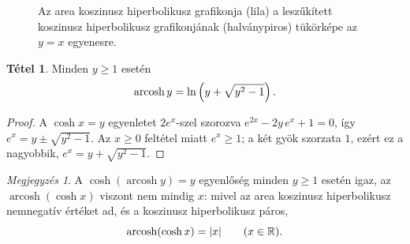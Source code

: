 \documentclass[11pt]{scrartcl}
\DeclareMathOperator{\arcosh}{arcosh}
\theoremstyle{definition}
\newtheorem{theorem}[definition]{Tétel}
\newtheorem{example}[definition]{Példa}
\theoremstyle{remark}
\newtheorem*{remark}{Megjegyzés}
\begin{document}
\begin{figure}[ht]
	\centering
	\caption{Az area koszinusz hiperbolikusz grafikonja (lila) a leszűkített
		koszinusz hiperbolikusz grafikonjának (halványpiros) tükörképe az
		$y = x$ egyenesre.}
	\label{fig:arcosh}
\end{figure}

\begin{theorem}
	Minden $y \ge 1$ esetén
	\[
		\arcosh y = \ln\left(y + \sqrt{y^2 - 1}\right)\text.
	\]
\end{theorem}

\begin{proof}
	A $\cosh x = y$ egyenletet $2e^x$-szel szorozva
	$e^{2x} - 2y\,e^x + 1 = 0$, így $e^x = y \pm \sqrt{y^2 - 1}$. Az
	$x \ge 0$ feltétel miatt $e^x \ge 1$; a két gyök szorzata $1$, ezért ez a
	nagyobbik, $e^x = y + \sqrt{y^2 - 1}$.
\end{proof}

\begin{remark}
	A $\cosh(\arcosh y) = y$ egyenlőség minden $y \ge 1$ esetén igaz, az
	$\arcosh(\cosh x)$ viszont nem mindig $x$: mivel az area koszinusz
	hiperbolikusz nemnegatív értéket ad, és a koszinusz hiperbolikusz páros,
	\[
		\arcosh(\cosh x) = |x| \qquad (x \in \mathbb{R})\text.
	\]
\end{remark}

%
\end{document}
